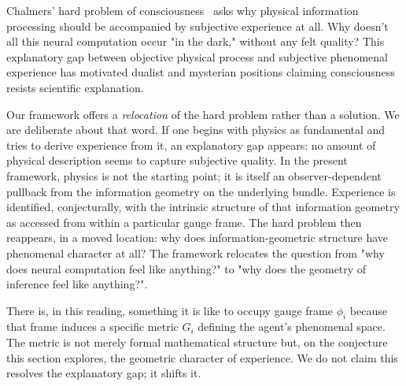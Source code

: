 \documentclass[11pt]{article}
\begin{document}
Chalmers' hard problem of consciousness~\cite{Chalmers1995, Chalmers1996} asks why physical information processing should be accompanied by subjective experience at all. Why doesn't all this neural computation occur "in the dark," without any felt quality? This explanatory gap between objective physical process and subjective phenomenal experience has motivated dualist and mysterian positions claiming consciousness resists scientific explanation.

Our framework offers a \emph{relocation} of the hard problem rather than a solution. We are deliberate about that word. If one begins with physics as fundamental and tries to derive experience from it, an explanatory gap appears: no amount of physical description seems to capture subjective quality. In the present framework, physics is not the starting point; it is itself an observer-dependent pullback from the information geometry on the underlying bundle. Experience is identified, conjecturally, with the intrinsic structure of that information geometry as accessed from within a particular gauge frame. The hard problem then reappears, in a moved location: why does information-geometric structure have phenomenal character at all? The framework relocates the question from "why does neural computation feel like anything?" to "why does the geometry of inference feel like anything?".

There is, in this reading, something it is like to occupy gauge frame $\phi_i$ because that frame induces a specific metric $G_i$ defining the agent's phenomenal space. The metric is not merely formal mathematical structure but, on the conjecture this section explores, the geometric character of experience. We do not claim this resolves the explanatory gap; it shifts it.
\end{document}
